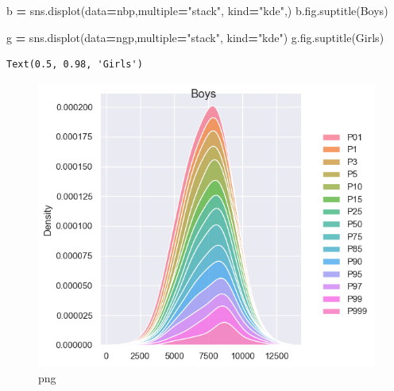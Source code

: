 \documentclass[
]{article}
\newenvironment{Shaded}{\begin{snugshade}}{\end{snugshade}}
\newcommand{\NormalTok}[1]{#1}
\newcommand{\OperatorTok}[1]{\textcolor[rgb]{0.81,0.36,0.00}{\textbf{#1}}}
\newcommand{\StringTok}[1]{\textcolor[rgb]{0.31,0.60,0.02}{#1}}
\begin{document}
\begin{Shaded}
\begin{Highlighting}[]
\NormalTok{b }\OperatorTok{=}\NormalTok{ sns.displot(data}\OperatorTok{=}\NormalTok{nbp,multiple}\OperatorTok{=}\StringTok{"stack"}\NormalTok{, kind}\OperatorTok{=}\StringTok{"kde"}\NormalTok{,)}
\NormalTok{b.fig.suptitle(}\StringTok{\textquotesingle{}Boys\textquotesingle{}}\NormalTok{)}

\NormalTok{g }\OperatorTok{=}\NormalTok{ sns.displot(data}\OperatorTok{=}\NormalTok{ngp,multiple}\OperatorTok{=}\StringTok{"stack"}\NormalTok{, kind}\OperatorTok{=}\StringTok{"kde"}\NormalTok{)}
\NormalTok{g.fig.suptitle(}\StringTok{\textquotesingle{}Girls\textquotesingle{}}\NormalTok{)}
\end{Highlighting}
\end{Shaded}

\begin{verbatim}
Text(0.5, 0.98, 'Girls')
\end{verbatim}

\begin{figure}
\centering
\includegraphics{output_33_1.png}
\caption{png}
\end{figure}
\end{document}
